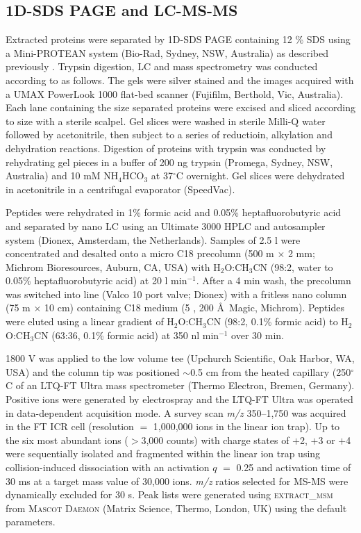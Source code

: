 \subsection{\acs{1D-SDS PAGE} and \acs{LC}-\acs{MS-MS}}
Extracted proteins were separated by \ac{1D-SDS PAGE} containing 12 \% SDS using a Mini-PROTEAN system (Bio-Rad, Sydney, NSW, Australia) as described previously \cite{Saunders2006}.
Trypsin digestion, \ac{LC} and mass spectrometry was conducted according to \citet{Ng2010a} as follows.
The gels were silver stained and the images acquired with a UMAX PowerLook 1000 flat-bed scanner (Fujifilm, Berthold, Vic, Australia).
Each lane containing the size separated proteins were excised and sliced according to size with a sterile scalpel.
Gel slices were washed in sterile Milli-Q water followed by acetonitrile, then subject to a series of reductioin, alkylation and dehydration reactions.
Digestion of proteins with trypsin was conducted by rehydrating gel pieces in a buffer of 200 ng trypsin (Promega, Sydney, NSW, Australia) and 10 mM NH$_4$HCO$_3$ at 37$^{\circ}$C overnight. 
Gel slices were dehydrated in acetonitrile in a centrifugal evaporator (SpeedVac).

Peptides were rehydrated in 1\% formic acid and 0.05\% heptafluorobutyric acid and separated by nano \ac{LC} using an Ultimate 3000 \acs{HPLC} and autosampler system (Dionex, Amsterdam, the Netherlands).
Samples of 2.5 \textmu{}l were concentrated and desalted onto a micro C18 precolumn (500 \textmu{}m $\times$ 2 mm; Michrom Bioresources, Auburn, \textsc{CA}, \textsc{USA}) with H$_2$O:CH$_3$CN (98:2, water to 0.05\% heptafluorobutyric acid) at 20 \textmu{}l min$^{-1}$.
After a 4 min wash, the precolumn was switched into line (Valco 10 port valve; Dionex) with a fritless nano column (75 \textmu{}m $\times$ 10 cm) containing C18 medium (5 \textmu{}, 200 \AA\ Magic, Michrom).
Peptides were eluted using a linear gradient of H$_2$O:CH$_3$CN (98:2, 0.1\% formic acid) to H$_2$O:CH$_3$CN (63:36, 0.1\% formic acid) at 350 nl min$^{-1}$ over 30 min.

1800 V was applied to the low volume tee (Upchurch Scientific, Oak Harbor, \textsc{WA}, \textsc{USA}) and the column tip was positioned $\sim$0.5 cm from the heated capillary (250$^{\circ}$C of an LTQ-FT Ultra mass spectrometer (Thermo Electron, Bremen, Germany).
Positive ions were generated by electrospray and the LTQ-FT Ultra was operated in data-dependent acquisition mode.
A survey scan \emph{m/z} 350--1,750 was acquired in the FT ICR cell (resolution $=$ 1,000,000 ions in the linear ion trap).
Up to the six most abundant ions ($>$3,000 counts) with charge states of $+$2, $+$3 or $+$4 were sequentially isolated and fragmented within the linear ion trap using collision-induced dissociation with an activation $q$ $=$ 0.25 and activation time of 30 ms at a target mass value of 30,000 ions.
\emph{m/z} ratios selected for \ac{MS-MS} were dynamically excluded for 30 s.
Peak lists were generated using \textsc{extract\_msm} from \textsc{Mascot Daemon} (Matrix Science, Thermo, London, \textsc{UK}) using the default parameters.

